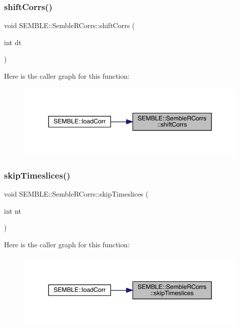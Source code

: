 \subsubsection{\texorpdfstring{shiftCorrs()}{shiftCorrs()}}
{\footnotesize\ttfamily void S\+E\+M\+B\+L\+E\+::\+Semble\+R\+Corrs\+::shift\+Corrs (\begin{DoxyParamCaption}\item[{int}]{dt }\end{DoxyParamCaption})}

Here is the caller graph for this function\+:
\nopagebreak
\begin{figure}[H]
\begin{center}
\leavevmode
\includegraphics[width=344pt]{d4/d78/classSEMBLE_1_1SembleRCorrs_a7d8a67b5a5bf59715606b694890dba92_icgraph}
\end{center}
\end{figure}
\mbox{\label{classSEMBLE_1_1SembleRCorrs_aec2e6a0104168e83d6f95be39187dd01}} 
\subsubsection{\texorpdfstring{skipTimeslices()}{skipTimeslices()}}
{\footnotesize\ttfamily void S\+E\+M\+B\+L\+E\+::\+Semble\+R\+Corrs\+::skip\+Timeslices (\begin{DoxyParamCaption}\item[{int}]{nt }\end{DoxyParamCaption})}

Here is the caller graph for this function\+:
\nopagebreak
\begin{figure}[H]
\begin{center}
\leavevmode
\includegraphics[width=344pt]{d4/d78/classSEMBLE_1_1SembleRCorrs_aec2e6a0104168e83d6f95be39187dd01_icgraph}
\end{center}
\end{figure}
\mbox{\label{classSEMBLE_1_1SembleRCorrs_ab8d8237902ed16cacac1910994db717b}} 
